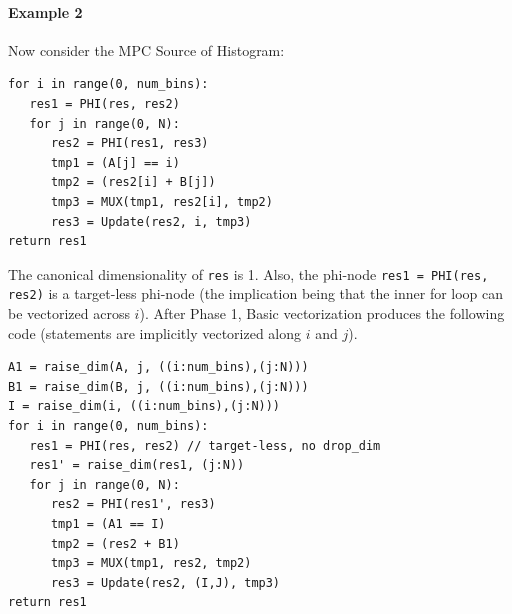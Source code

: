 \documentclass[sigconf, screen, natbib=false, dvipsnames, table]{acmart}
\theoremstyle{definition}
\begin{document}

\paragraph{Example 2} Now consider the MPC Source of Histogram:

{\small
\begin{verbatim}
for i in range(0, num_bins):
   res1 = PHI(res, res2)
   for j in range(0, N):
      res2 = PHI(res1, res3)
      tmp1 = (A[j] == i)
      tmp2 = (res2[i] + B[j])
      tmp3 = MUX(tmp1, res2[i], tmp2)
      res3 = Update(res2, i, tmp3)     
return res1
\end{verbatim}
}

The canonical dimensionality of \texttt{res} is 1. Also, the phi-node \texttt{res1 = PHI(res, res2)} is a target-less phi-node (the implication being that the inner for loop can be vectorized across $i$). After Phase 1, Basic vectorization produces the following code (statements are implicitly vectorized along $i$ and $j$). 

{\small
\begin{verbatim}
A1 = raise_dim(A, j, ((i:num_bins),(j:N)))
B1 = raise_dim(B, j, ((i:num_bins),(j:N)))
I = raise_dim(i, ((i:num_bins),(j:N)))
for i in range(0, num_bins):
   res1 = PHI(res, res2) // target-less, no drop_dim
   res1' = raise_dim(res1, (j:N))
   for j in range(0, N):
      res2 = PHI(res1', res3)
      tmp1 = (A1 == I)
      tmp2 = (res2 + B1)
      tmp3 = MUX(tmp1, res2, tmp2)
      res3 = Update(res2, (I,J), tmp3) 
return res1
\end{verbatim}
}
\end{document}
